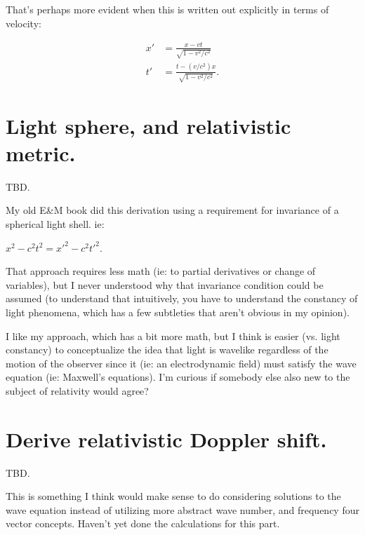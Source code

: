 That's perhaps more evident when this is written out explicitly in terms of velocity:

\begin{align}
x' &= \frac{x - v t}{\sqrt{1 - v^2/c^2}} \\
t' &= \frac{t - (v/c^2) x}{\sqrt{1 - v^2/c^2}}.
\end{align}

\section{Light sphere, and relativistic metric. }

TBD.

My old E\&M book did this derivation using a requirement for invariance of a spherical light shell.  ie:

$x^2 - c^2 t^2 = x'^2 - c^2 t'^2$.

That approach requires less math (ie: to partial derivatives or change of variables), but I never understood why that invariance condition could be assumed (to understand that intuitively, you have to understand the constancy of light phenomena, which has a few subtleties that aren't obvious in my opinion).

I like my approach, which has a bit more math, but I think is easier (vs. light constancy) to conceptualize the idea that light is wavelike regardless of the motion of the observer since it (ie: an electrodynamic field) must satisfy the wave equation (ie: Maxwell's equations).  I'm curious if somebody else also new to the subject of relativity would agree?

\section{Derive relativistic Doppler shift.}

TBD.

This is something I think would make sense to do considering solutions
to the wave
equation instead of utilizing more abstract wave number, and frequency
four vector concepts.  Haven't yet done the calculations for this part.
